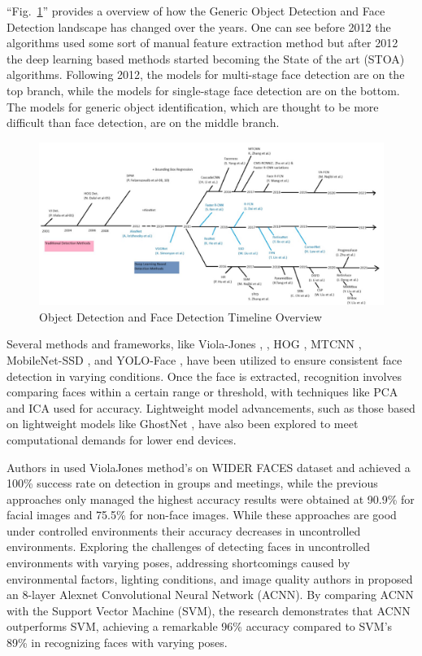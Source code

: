 ``Fig.~\ref{od-timeline}'' provides a overview of how the Generic Object Detection and Face Detection landscape has changed over the years. One can see before 2012 the algorithms used some sort of manual feature extraction method but after 2012 the deep learning based methods started becoming the State of the art (STOA) algorithms. Following 2012, the models for multi-stage face detection are on the top branch, while the models for single-stage face detection are on the bottom. The models for generic object identification, which are thought to be more difficult than face detection, are on the middle branch.

\begin{figure}[htbp]
\centerline{\includegraphics[width=\columnwidth]{components/images/od-timeline.jpg}}
\caption{Object Detection and Face Detection Timeline Overview}
\label{od-timeline}
\end{figure}

Several methods and frameworks, like Viola-Jones \cite{sumanto_viola-jones_2022}, \cite{rani_face_2022}, HOG \cite{rani_face_2022}, MTCNN \cite{rani_face_2022}, MobileNet-SSD \cite{chan_face_2022}, and YOLO-Face \cite{wang_yolov5s-face_2022}, have been utilized to ensure consistent face detection in varying conditions. Once the face is extracted, recognition involves comparing faces within a certain range or threshold, with techniques like PCA and ICA used for accuracy. Lightweight model advancements, such as those based on lightweight models like GhostNet \cite{alansari_ghostfacenets_2023}, have also been explored to meet computational demands for lower end devices.

Authors in \cite{sumanto_viola-jones_2022} used ViolaJones method's on WIDER FACES dataset and achieved a 100\% success rate on detection in groups and meetings, while the previous approaches only managed the highest accuracy results were obtained at 90.9\% for facial images and 75.5\% for non-face images. While these approaches are good under controlled environments their accuracy decreases in uncontrolled environments. Exploring the challenges of detecting faces in uncontrolled environments with varying poses, addressing shortcomings caused by environmental factors, lighting conditions, and image quality authors in \cite{mahesh_smart_2022} proposed an 8-layer Alexnet Convolutional Neural Network (ACNN). By comparing ACNN with the Support Vector Machine (SVM), the research demonstrates that ACNN outperforms SVM, achieving a remarkable 96\% accuracy compared to SVM's 89\% in recognizing faces with varying poses.

